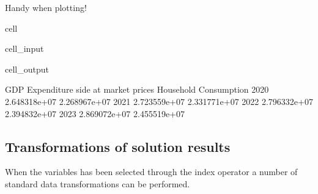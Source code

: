 \documentclass[letterpaper,10pt,english]{jupyterBook}
\begin{document}
\sphinxAtStartPar
Handy when plotting!

\begin{sphinxuseclass}{cell}\begin{sphinxVerbatimInput}

\begin{sphinxuseclass}{cell_input}
\begin{sphinxVerbatim}[commandchars=\\\{\}]
\PYG{p}{[}\PYG{p}{]}
\end{sphinxVerbatim}

\end{sphinxuseclass}\end{sphinxVerbatimInput}
\begin{sphinxVerbatimOutput}

\begin{sphinxuseclass}{cell_output}
\begin{sphinxVerbatim}[commandchars=\\\{\}]
      GDP Expenditure side at market prices  Household Consumption
2020                           2.648318e+07           2.268967e+07
2021                           2.723559e+07           2.331771e+07
2022                           2.796332e+07           2.394832e+07
2023                           2.869072e+07           2.455519e+07
\end{sphinxVerbatim}

\end{sphinxuseclass}\end{sphinxVerbatimOutput}

\end{sphinxuseclass}

\subsection{Transformations of solution results}
\label{\detokenize{content/Python/modelflow_features:transformations-of-solution-results}}
\sphinxAtStartPar
When the variables has been selected through the index operator a number of standard data transformations can be performed.
\end{document}
